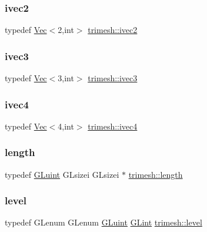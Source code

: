 \subsubsection{\texorpdfstring{ivec2}{ivec2}}
{\footnotesize\ttfamily typedef \hyperlink{classtrimesh_1_1Vec}{Vec}$<$2,int$>$ \hyperlink{namespacetrimesh_a70e381a5073e5b5555b5c8c168c9375f}{trimesh\+::ivec2}}

\mbox{\label{namespacetrimesh_aac2b29443f1e16cabbb5da4e8a769f27}} 
\subsubsection{\texorpdfstring{ivec3}{ivec3}}
{\footnotesize\ttfamily typedef \hyperlink{classtrimesh_1_1Vec}{Vec}$<$3,int$>$ \hyperlink{namespacetrimesh_aac2b29443f1e16cabbb5da4e8a769f27}{trimesh\+::ivec3}}

\mbox{\label{namespacetrimesh_ab9dd19161c2242c73c5c0fb468e21d74}} 
\subsubsection{\texorpdfstring{ivec4}{ivec4}}
{\footnotesize\ttfamily typedef \hyperlink{classtrimesh_1_1Vec}{Vec}$<$4,int$>$ \hyperlink{namespacetrimesh_ab9dd19161c2242c73c5c0fb468e21d74}{trimesh\+::ivec4}}

\mbox{\label{namespacetrimesh_ad67aebb2caf29002f1fc65745e7b790b}} 
\subsubsection{\texorpdfstring{length}{length}}
{\footnotesize\ttfamily typedef \hyperlink{namespacetrimesh_ad2289423ef47b393854afc30451d433b}{G\+Luint} G\+Lsizei G\+Lsizei $\ast$ \hyperlink{namespacetrimesh_ad67aebb2caf29002f1fc65745e7b790b}{trimesh\+::length}}

\mbox{\label{namespacetrimesh_a4f273d6a2251d340a8657f3574b6a615}} 
\subsubsection{\texorpdfstring{level}{level}}
{\footnotesize\ttfamily typedef G\+Lenum G\+Lenum \hyperlink{namespacetrimesh_ad2289423ef47b393854afc30451d433b}{G\+Luint} \hyperlink{namespacetrimesh_aeccc290e30b317c861fb146956528187}{G\+Lint} \hyperlink{namespacetrimesh_a4f273d6a2251d340a8657f3574b6a615}{trimesh\+::level}}

